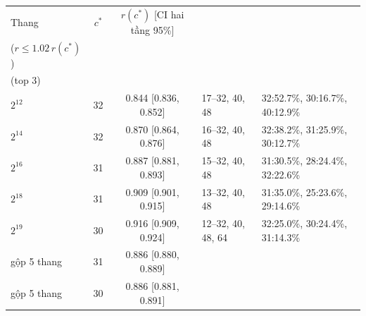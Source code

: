 \begin{tabularx}{\linewidth}{lcclX}
\toprule
Thang & $c^*$ & $r(c^*)$ [CI hai tầng 95\%] & \makecell{{Gần tối ưu} \\ {($r\le1.02\,r(c^*)$)}} & \makecell{{Argmin bootstrap} \\ {(top 3)}} \\
\midrule
$2^{12}$ & 32 & 0.844 [0.836, 0.852] & 17--32, 40, 48 & 32:52.7\%, 30:16.7\%, 40:12.9\% \\
$2^{14}$ & 32 & 0.870 [0.864, 0.876] & 16--32, 40, 48 & 32:38.2\%, 31:25.9\%, 30:12.7\% \\
$2^{16}$ & 31 & 0.887 [0.881, 0.893] & 15--32, 40, 48 & 31:30.5\%, 28:24.4\%, 32:22.6\% \\
$2^{18}$ & 31 & 0.909 [0.901, 0.915] & 13--32, 40, 48 & 31:35.0\%, 25:23.6\%, 29:14.6\% \\
$2^{19}$ & 30 & 0.916 [0.909, 0.924] & 12--32, 40, 48, 64 & 32:25.0\%, 30:24.4\%, 31:14.3\% \\
\midrule
gộp 5 thang & 31 & 0.886 [0.880, 0.889] &  &  \\
gộp 5 thang & 30 & 0.886 [0.881, 0.891] &  &  \\
\bottomrule
\end{tabularx}
